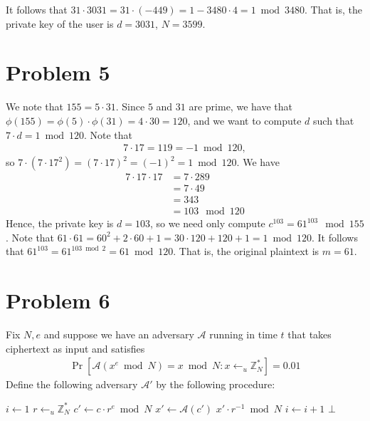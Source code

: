 \documentclass[12pt]{article}
\numberwithin{equation}{section}
\theoremstyle{plain}
\DeclareMathOperator*{\prob}{Pr}
\newcommand{\adv}{\mathcal{A}}
\newcommand{\advv}{\mathcal{A}'}
\begin{document}
It follows that $31 \cdot 3031 = 31 \cdot (-449) = 1 - 3480 \cdot 4 = 1 \bmod 3480$.
That is, the private key of the user is $d=3031$, $N=3599$.


\section*{Problem 5}

We note that $155 = 5 \cdot 31$.
Since $5$ and $31$ are prime,
we have that $\phi(155) = \phi(5) \cdot \phi(31) = 4 \cdot 30 = 120$,
and we want to compute $d$ such that $7 \cdot d = 1 \bmod 120$.
Note that
\begin{gather*}
    7 \cdot 17 = 119 = -1 \bmod 120,
\end{gather*}
so $7 \cdot (7 \cdot 17^2) = (7 \cdot 17)^2 = (-1)^2 = 1 \bmod 120$.
We have
\begin{align*}
    7 \cdot 17 \cdot 17
        &= 7 \cdot 289\\
        &= 7 \cdot 49\\
        &= 343\\
        &= 103 \mod 120
\end{align*}
Hence, the private key is $d = 103$, so we need only compute $c^{103} = 61^{103} \mod 155$.
Note that $61 \cdot 61 = 60^2 + 2 \cdot 60 + 1 = 30 \cdot 120 + 120 + 1 = 1 \bmod 120$.
It follows that $61^{103} = 61^{103 \bmod 2} = 61 \bmod 120$.
That is, the original plaintext is $m = 61$.

\section*{Problem 6}

Fix $N, e$ and suppose we have an adversary $\adv$ running in time $t$ that takes ciphertext as input and satisfies
\begin{gather*}
    \prob[\adv(x^e \bmod N) = x \bmod N : x \gets_u \mathbb{Z}^*_N] = 0.01
\end{gather*}
Define the following adversary $\advv$ by the following procedure:
\begin{algorithm}[H]
\begin{algorithmic}[1]
\Procedure{$\advv$}{c}
    \State $i \gets 1$
        \State $r \gets_u \mathbb{Z}^*_N$\label{alg:sample}
        \State $c' \gets c \cdot r^e \bmod N$\label{alg:uniform}
        \State $x' \gets \adv(c')$\label{alg:subroutine}
        \label{alg:verify}
            \State \Return $x' \cdot r^{-1} \bmod N$\label{alg:inverse}
        \EndIf
        \State $i \gets i+1$\label{alg:update}
    \EndWhile
    \State \Return $\bot$
\EndProcedure
\end{algorithmic}
\end{algorithm}
\end{document}

